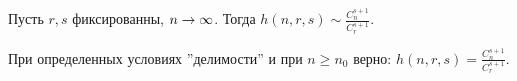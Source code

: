 \begin{theorem}[(б/д) Рёдль, 1980е]
    Пусть \(r, s\) фиксированны, \(n \rightarrow \infty\). Тогда \(h(n, r, s) \sim \frac{C_n^{s + 1}}{C_r^{s + 1}}\).
\end{theorem}

\begin{theorem}[(б/д) Киваш, 2010е]
    При определенных условиях ''делимости'' и при \(n \ge n_0\) верно: \(h(n, r, s) = \frac{C_n^{s + 1}}{C_r^{s + 1}}\).
\end{theorem}
